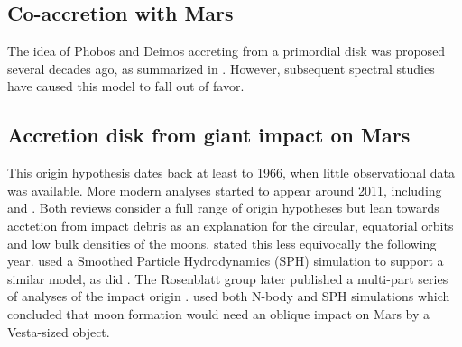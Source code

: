 
\subsection{Co-accretion with Mars}

The idea of Phobos and Deimos accreting from a primordial disk was proposed several decades ago, as summarized in \citet{burns_contradictory_1992}. However, subsequent spectral studies have caused this model to fall out of favor.

\subsection{Accretion disk from giant impact on Mars}

This origin hypothesis dates back at least to 1966, when little observational data was available. More modern analyses started to appear around 2011, including \citet{craddock_are_2011} and  \citet{rosenblatt_origin_2011}. Both reviews consider a full range of origin hypotheses but lean towards acctetion from impact debris as an explanation for the circular, equatorial orbits and low bulk densities of the moons.  \citet{rosenblatt_formation_2012} stated this less equivocally the following year. \citet{citron_formation_2015} used a Smoothed Particle Hydrodynamics (SPH) simulation to support a similar model, as did \citet{rosenblatt_accretion_2016}. The Rosenblatt group later published a multi-part series of analyses of the impact origin \citep{hyodo_impact_2017, hyodo_impact_2017-1, hyodo_impact_2018}. \citet{canup_origin_2018} used both N-body and SPH simulations which concluded that moon formation would need an oblique impact on Mars by a Vesta-sized object.




{}

	
	


